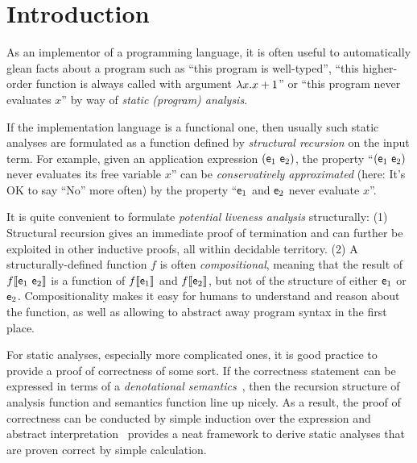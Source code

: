 \section{Introduction}
\label{sec:introduction}

As an implementor of a programming language, it is often useful to automatically
glean facts about a program such as ``this program is well-typed'', ``this
higher-order function is always called with argument $\lambda x. x+1$'' or ``this
program never evaluates $x$'' by way of \emph{static (program) analysis}.

If the implementation language is a functional one, then usually such static
analyses are formulated as a function defined by \emph{structural recursion} on
the input term.
For example, given an application expression $(\mathsf{e}_1~\mathsf{e}_2)$,
the property ``$(\mathsf{e}_1~\mathsf{e}_2)$ never evaluates its free variable $x$'' can be
\emph{conservatively approximated} (here: It's OK to say ``No'' more often) by
the property ``$\mathsf{e}_1$ and $\mathsf{e}_2$ never evaluate $x$''.

It is quite convenient to formulate \emph{potential liveness analysis}
structurally:
(1) Structural recursion gives an immediate proof of termination and can
    further be exploited in other inductive proofs, all within decidable
    territory.
(2) A structurally-defined function $f$ is often \emph{compositional}, meaning that
    the result of $f\llbracket {\mathsf{e}_1~\mathsf{e}_2} \rrbracket$ is a function of $f\llbracket {\mathsf{e}_1} \rrbracket$ and
    $f\llbracket {\mathsf{e}_2} \rrbracket$, but not of the structure of either $\mathsf{e}_1$ or $\mathsf{e}_2$.
    Compositionality makes it easy for humans to understand and reason about the
    function, as well as allowing to abstract away program syntax in the first
    place.

For static analyses, especially more complicated ones, it is good practice to
provide a proof of correctness of some sort. If the correctness statement can
be expressed in terms of a \emph{denotational
semantics}~\citep{ScottStrachey:71}, then the recursion structure of analysis
function and semantics function line up nicely. As a result, the proof of
correctness can be conducted by simple induction over the expression and
abstract interpretation~\citep{Cousot:21} provides a neat framework to derive
static analyses that are proven correct by simple calculation.

